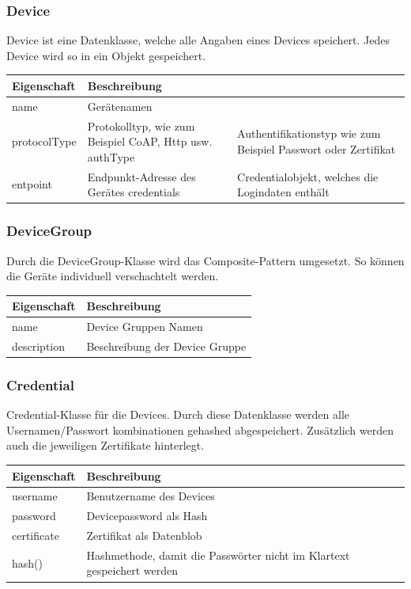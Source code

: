 \subsubsection{Device}
Device ist eine Datenklasse, welche alle Angaben eines Devices speichert. Jedes Device wird so in ein Objekt gespeichert.
\begin{table}[H]
\centering
    \begin{tabular}{@{}l p{14.1cm} @{}}\toprule    
    {Eigenschaft} & {Beschreibung}\\ \midrule      
    name & Gerätenamen \\
    protocolType & Protokolltyp, wie zum Beispiel CoAP, Http usw.
    authType & Authentifikationstyp wie zum Beispiel Passwort oder Zertifikat  \\
    entpoint & Endpunkt-Adresse des Gerätes
    credentials & Credentialobjekt, welches die Logindaten enthält
    \bottomrule
    \end{tabular}
\end{table}

\subsubsection{DeviceGroup}
Durch die DeviceGroup-Klasse wird das Composite-Pattern umgesetzt. So können die Geräte individuell verschachtelt werden.
\begin{table}[H]
\centering
    \begin{tabular}{@{}l p{14.1cm} @{}}\toprule    
    {Eigenschaft} & {Beschreibung}\\ \midrule      
    name & Device Gruppen Namen\\
    description & Beschreibung der Device Gruppe \\
    \bottomrule
    \end{tabular}
\end{table}

\subsubsection{Credential}
Credential-Klasse für die Devices. Durch diese Datenklasse werden alle Usernamen/Passwort kombinationen gehashed abgespeichert. Zusätzlich werden auch die jeweiligen Zertifikate hinterlegt.
\begin{table}[H]
\centering
    \begin{tabular}{@{}l p{14.1cm} @{}}\toprule    
    {Eigenschaft} & {Beschreibung}\\ \midrule      
    username & Benutzername des Devices \\
    password & Devicepassword als Hash\\
    certificate & Zertifikat als Datenblob\\
    hash() & Hashmethode, damit die Passwörter nicht im Klartext gespeichert werden\\
    \bottomrule
    \end{tabular}
\end{table}


